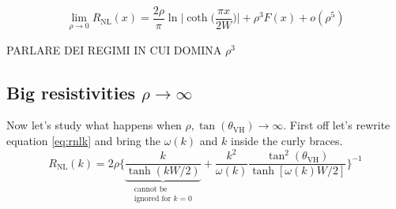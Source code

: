 \begin{equation}
    \lim_{\rho\to 0} R_{\textrm{NL}}(x)=
    \frac{2\rho}\pi\ln\bigg |\coth \Big(\frac{\pi x}{2W}\Big)\bigg | +
    \rho^3F(x) +
    o(\rho^5)
    \label{eq:lowrho}
\end{equation}

PARLARE DEI REGIMI IN CUI DOMINA $\rho^3$



















\subsection{Big resistivities $\rho\to \infty$}
\label{sec:highrho}
Now let's study what happens when $\rho,\tan(\theta_{\textrm{VH}})\to \infty$. First off let's rewrite equation \ref{eq:rnlk} and bring the $\omega(k)$ and $k$ inside the curly braces.
\begin{equation}
        R_{\textrm{NL}}(k)=2\rho
    \bigg\{
        \underbrace{\frac{k}{\tanh(kW/2)}}_{\substack{\text{cannot be}\\\text{ignored for } k=0}} + \frac {k^2}{\omega(k)}\frac{\tan^2(\theta_{\textrm{VH}})}{\tanh[\omega(k)W/2]}    
    \bigg\}^{-1}
    \label{eq:rhoinf1}
\end{equation}

